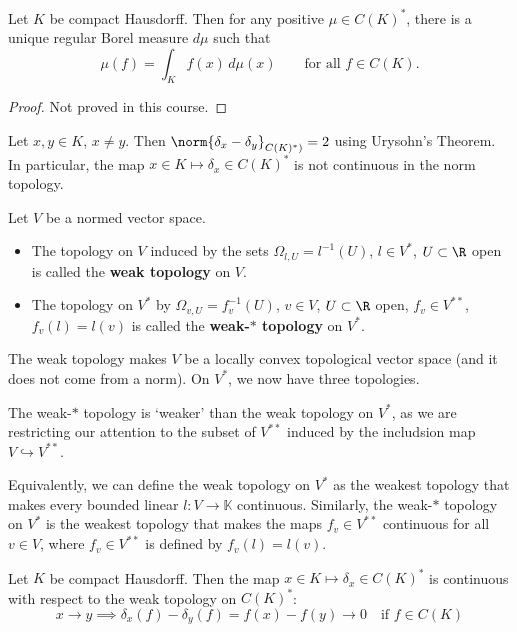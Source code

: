 \documentclass{article}
\newcommand{\K}{\mathbb{K}}
\begin{document}
\begin{thm}
    Let $K$ be compact Hausdorff. Then for any positive $\mu \in C(K)^*$, there is a unique regular Borel measure $d\mu$ such that
    \begin{equation*}
        \mu(f) = \int_K f(x) \, d\mu(x) \qquad \text{for all } f \in C(K).
    \end{equation*}
\end{thm}

\begin{proof}
    Not proved in this course.
\end{proof}

\begin{eg}
    Let $x, y \in K$, $x \neq y$. Then $\norm{\delta_x - \delta_y}_{C(K)^*)} = 2$ using Urysohn's Theorem.
    In particular, the map $x \in K \mapsto \delta_x \in C(K)^*$ is not continuous in the norm topology.
\end{eg}

\begin{defi}
    Let $V$ be a normed vector space.
    \begin{itemize}
        \item The topology on $V$ induced by the sets $\Omega_{l, U} = l^{-1}(U)$, $l \in V^*$, $U \subset \R$ open is called the \textbf{weak topology} on $V$.
        \item The topology on $V^*$ by $\Omega_{v, U} = f_v^{-1}(U)$, $v \in V$, $U \subset \R$ open, $f_v \in V^{**}$, $f_v(l) = l(v)$ is called the \textbf{weak-$*$ topology} on $V^*$.
    \end{itemize}
\end{defi}

The weak topology makes $V$ be a locally convex topological vector space (and it does not come from a norm). On $V^*$, we now have three topologies.

The weak-$*$ topology is `weaker' than the weak topology on $V^*$, as we are restricting our attention to the subset of $V^{**}$ induced by the includsion map $V \hookrightarrow V^{**}$.


Equivalently, we can define the weak topology on $V^*$ as the weakest topology that makes every bounded linear $l: V \to \K$ continuous.
Similarly, the weak-$*$ topology on $V^*$ is the weakest topology that makes the maps $f_v \in V^{**}$ continuous for all $v \in V$, where $f_v \in V^{**}$ is defined by $f_v(l) = l(v)$.

\begin{eg}
    Let $K$ be compact Hausdorff. Then the map $x \in K \mapsto \delta_x \in C(K)^*$ is continuous with respect to the weak topology on $C(K)^*$:
    \begin{equation*}
        x \to y \implies \delta_x(f) - \delta_y(f) = f(x) - f(y) \to 0 \quad \text{if } f \in C(K)
    \end{equation*}
\end{eg}
\end{document}
